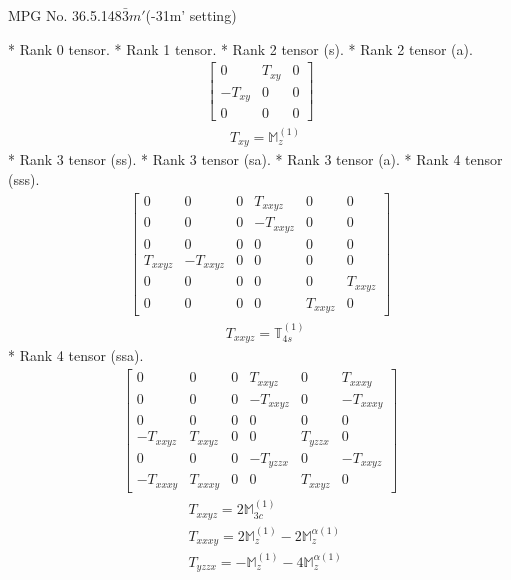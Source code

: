 \documentclass[fleqn,8pt,landscape]{jsarticle}
\begin{document}
\setcounter{MaxMatrixCols}{32}

\renewcommand{\tablename}{Table~}
\renewcommand{\figurename}{Figure~}
\begin{center}
\LARGE
MPG No. 36.5.148\quad$\bar{3}m'$\quad(-31m' setting)
\end{center}
* Rank 0 tensor.
* Rank 1 tensor.
* Rank 2 tensor (s).
* Rank 2 tensor (a).
\begin{align*}
\begin{bmatrix} 0 & T_{xy} & 0 \\ - T_{xy} & 0 & 0 \\ 0 & 0 & 0 \end{bmatrix}
\end{align*}
\begin{align*}
& T_{xy} = \mathbb{M}_{z}^{(1)}
\end{align*}
* Rank 3 tensor (ss).
* Rank 3 tensor (sa).
* Rank 3 tensor (a).
* Rank 4 tensor (sss).
\begin{align*}
\begin{bmatrix} 0 & 0 & 0 & T_{xxyz} & 0 & 0 \\ 0 & 0 & 0 & - T_{xxyz} & 0 & 0 \\ 0 & 0 & 0 & 0 & 0 & 0 \\ T_{xxyz} & - T_{xxyz} & 0 & 0 & 0 & 0 \\ 0 & 0 & 0 & 0 & 0 & T_{xxyz} \\ 0 & 0 & 0 & 0 & T_{xxyz} & 0 \end{bmatrix}
\end{align*}
\begin{align*}
& T_{xxyz} = \mathbb{T}_{4s}^{(1)}
\end{align*}
* Rank 4 tensor (ssa).
\begin{align*}
\begin{bmatrix} 0 & 0 & 0 & T_{xxyz} & 0 & T_{xxxy} \\ 0 & 0 & 0 & - T_{xxyz} & 0 & - T_{xxxy} \\ 0 & 0 & 0 & 0 & 0 & 0 \\ - T_{xxyz} & T_{xxyz} & 0 & 0 & T_{yzzx} & 0 \\ 0 & 0 & 0 & - T_{yzzx} & 0 & - T_{xxyz} \\ - T_{xxxy} & T_{xxxy} & 0 & 0 & T_{xxyz} & 0 \end{bmatrix}
\end{align*}
\begin{align*}
& T_{xxyz} = 2 \mathbb{M}_{3c}^{(1)} \\
& T_{xxxy} = 2 \mathbb{M}_{z}^{(1)} - 2 \mathbb{M}_{z}^{\alpha(1)} \\
& T_{yzzx} = - \mathbb{M}_{z}^{(1)} - 4 \mathbb{M}_{z}^{\alpha(1)}
\end{align*}
\end{document}
